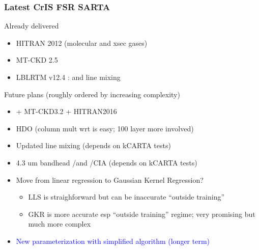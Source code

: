 \documentclass[10pt,t]{beamer}
\begin{document}
\begin{frame}
  \frametitle{Latest CrIS FSR SARTA}
  Already delivered
  
  \begin{itemize}
  \item HITRAN 2012 (molecular and xsec gases)
  \item MT-CKD 2.5
  \item LBLRTM v12.4 : \cd and \methane line mixing
  \end{itemize}

  Future plans (roughly ordered by increasing complexity)
  \begin{itemize}
  \item \amm + MT-CKD3.2 + HITRAN2016
  \item HDO (column mult wrt \water is easy; 100 layer more involved)
  \item Updated \cd line mixing (depends on kCARTA tests)
  \item 4.3 um bandhead \cd/\water and \cd/\nitrogen CIA (depends on kCARTA
    tests)
  \item Move from linear regression to Gaussian Kernel Regression?
    \begin{itemize}
    \item LLS is straighforward but can be inaccurate ``outside training''
    \item GKR is more accurate esp ``outside training'' regime; very
      promising but much more complex
    \end{itemize}
  \item \textcolor{blue}{New parameterization with simplified algorithm
      (longer term)}
  \end{itemize}
  
\end{frame}
\end{document}

